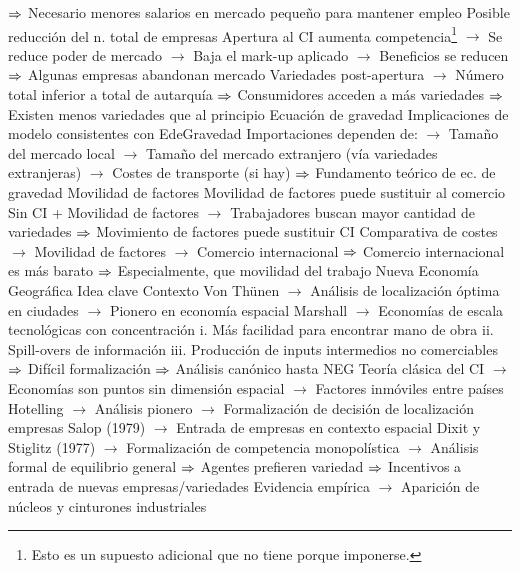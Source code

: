 \documentclass{nuevotema}
\begin{document}
\begin{esquemal}
				\4[] $\Rightarrow$ Necesario menores salarios en mercado pequeño para mantener empleo
				\4 Posible reducción del n. total de empresas
				\4[] Apertura al CI aumenta competencia\footnote{Esto es un supuesto adicional que no tiene porque imponerse.}
				\4[] $\to$ Se reduce poder de mercado
				\4[] $\to$ Baja el mark-up aplicado
				\4[] $\to$ Beneficios se reducen
				\4[] $\Rightarrow$ Algunas empresas abandonan mercado
				\4[] Variedades post-apertura
				\4[] $\to$ Número total inferior a total de autarquía
				\4[] $\Rightarrow$ Consumidores acceden a más variedades
				\4[] $\Rightarrow$ Existen menos variedades que al principio
				\4 Ecuación de gravedad
				\4[] Implicaciones de modelo consistentes con EdeGravedad
				\4[] Importaciones dependen de:
				\4[] $\to$ Tamaño del mercado local
				\4[] $\to$ Tamaño del mercado extranjero (vía variedades extranjeras)
				\4[] $\to$ Costes de transporte (si hay)
				\4[] $\Rightarrow$ Fundamento teórico de ec. de gravedad
				\4 Movilidad de factores
				\4[] Movilidad de factores puede sustituir al comercio
				\4[] Sin CI + Movilidad de factores
				\4[] $\to$ Trabajadores buscan mayor cantidad de variedades
				\4[] $\Rightarrow$ Movimiento de factores puede sustituir CI
				\4[] Comparativa de costes
				\4[] $\to$ Movilidad de factores
				\4[] $\to$ Comercio internacional
				\4[] $\Rightarrow$ Comercio internacional es más barato
				\4[] $\Rightarrow$ Especialmente, que movilidad del trabajo
		\2 Nueva Economía Geográfica
			\3 Idea clave
				\4 Contexto
				\4[] Von Thünen
				\4[] $\to$ Análisis de localización óptima en ciudades
				\4[] $\to$ Pionero en economía espacial
				\4[] Marshall
				\4[] $\to$ Economías de escala tecnológicas con concentración
				\4[] i. Más facilidad para encontrar mano de obra
				\4[] ii. Spill-overs de información
				\4[] iii. Producción de inputs intermedios no comerciables
				\4[] $\Rightarrow$ Difícil formalización
				\4[] $\Rightarrow$ Análisis canónico hasta NEG
				\4[] Teoría clásica del CI
				\4[] $\to$ Economías son puntos sin dimensión espacial
				\4[] $\to$ Factores inmóviles entre países
				\4[] Hotelling
				\4[] $\to$ Análisis pionero
				\4[] $\to$ Formalización de decisión de localización empresas
				\4[] Salop (1979)
				\4[] $\to$ Entrada de empresas en contexto espacial
				\4[] Dixit y Stiglitz (1977)
				\4[] $\to$ Formalización de competencia monopolística
				\4[] $\to$ Análisis formal de equilibrio general
				\4[] $\Rightarrow$ Agentes prefieren variedad
				\4[] $\Rightarrow$ Incentivos a entrada de nuevas empresas/variedades
				\4[] Evidencia empírica
				\4[] $\to$ Aparición de núcleos y cinturones industriales

\end{esquemal}
\end{document}
